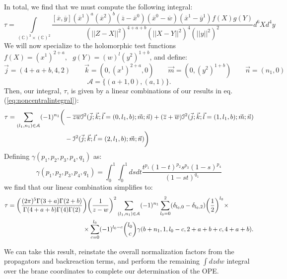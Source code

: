 \documentclass[../main.tex]{subfiles}
\begin{document}
In total, we find that we must compute the following integral:
\begin{equation}
    \tau = \underset{(\mathbb{C})^3 \times (\mathbb{C})^2}{\int} \frac{[\overline{x}, \overline{y}] (\overline{x}^1)^a (\overline{x}^2)^b (\overline{z}-\overline{x}^0) (\overline{x}^0 - \overline{w})(\overline{x}^1-\overline{y}^1) f(X) g(Y)}{(\vert \vert Z-
X \vert \vert^2)^{4+a+b}(\vert \vert X-Y \vert \vert^2)^4 (\vert \vert y \vert \vert^2)^2} d^6X d^4y
\end{equation}
We will now specialize to the holomorphic test functions $f(X) = (x^1)^{2+a}, \text{ } g(Y) = (w)^l (y^2)^{1+b}$, and define:
\begin{equation}
    \vec{j} = (4+a+b,4,2) \quad \quad \vec{k} = (0,(x^1)^{2+a},0) \quad \quad \vec{m} = (0, (y^2)^{1+b}) \quad \quad \vec{n} = (n_1, 0) 
\end{equation}
\begin{equation}
    \mathcal{A} = \{ (a+1,0),(a,1)\}.
\end{equation}
Then, our integral, $\tau$, is given by a linear combinations of our results in eq.(\ref{eq:noncentralintegral}):
\begin{align} 
    \tau = \sum_{(l_1,n_1) \in \mathcal{A}} (-1)^{n_1} \bigg( &- \overline{z} \overline{w} \mathcal{I}^2(\vec{j};\vec{k}; \vec{l} = (0,l_1,b);\vec{m};\vec{n}) +(\overline{z}+\overline{w}) \mathcal{I}^2(\vec{j};\vec{k}; \vec{l} = (1,l_1,b);\vec{m};\vec{n}) \notag \\  &-\mathcal{I}^2(\vec{j};\vec{k}; \vec{l} = (2,l_1,b);\vec{m};\vec{n})\bigg) 
\end{align}
Defining $\gamma(p_1,p_2,p_3,p_4,q_1)$ as:
\begin{equation}
    \gamma(p_1,p_2,p_3,p_4,q_1) = \int_0^1 \int_0^1 ds dt \frac{t^{p_1} (1-t)^{p_2} s^{p_3} (1-s)^{p_4}}{(1-st)^{q_1}}
\end{equation}
we find that our linear combination simplifies to:
\begin{align}\label{eq:noncentralanswer}
    \tau = \bigg( \frac{(2\pi)^5 \Gamma(3+a) \Gamma(2+b)}{\Gamma(4+a+b) \Gamma(4) \Gamma(2)}&\bigg) \bigg( \frac{1}{z-w} \bigg)^2 \sum_{(l_1,n_1) \in \mathcal{A}} (-1)^{n_1} \sum_{l_0=0}^2 (\delta_{l_0,0}-\delta_{l_0,2}) \bigg(\frac{1}{2}\bigg)^{l_0} \times \\
    & \times \sum_{c=0}^{l_0} (-1)^{l_0-c} {l_0 \choose c} \gamma(b+n_1,1,l_0-c,2+a+b+c,4+a+b). \notag
\end{align}

We can take this result, reinstate the overall normalization factors from the propagators and backreaction terms, and perform the remaining $\int dz dw$ integral over the brane coordinates to complete our determination of the OPE. 
\end{document}
